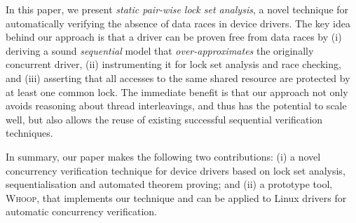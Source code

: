 In this paper, we present \emph{static pair-wise lock set analysis}, a novel technique for automatically verifying the absence of data races in device drivers. The key idea behind our approach is that a driver can be proven free from data races by (i) deriving a sound \emph{sequential} model that \emph{over-approximates} the originally concurrent driver, (ii) instrumenting it for lock set analysis and race checking, and (iii) asserting that all accesses to the same shared resource are protected by at least one common lock. The immediate benefit is that our approach not only avoids reasoning about thread interleavings, and thus has the potential to scale well, but also allows the reuse of existing successful sequential verification techniques.

In summary, our paper makes the following two contributions: (i) a novel concurrency verification technique for device drivers based on lock set analysis, sequentialisation and automated theorem proving; and (ii) a prototype tool, \textsc{Whoop}, that implements our technique and can be applied to Linux drivers for automatic concurrency verification.